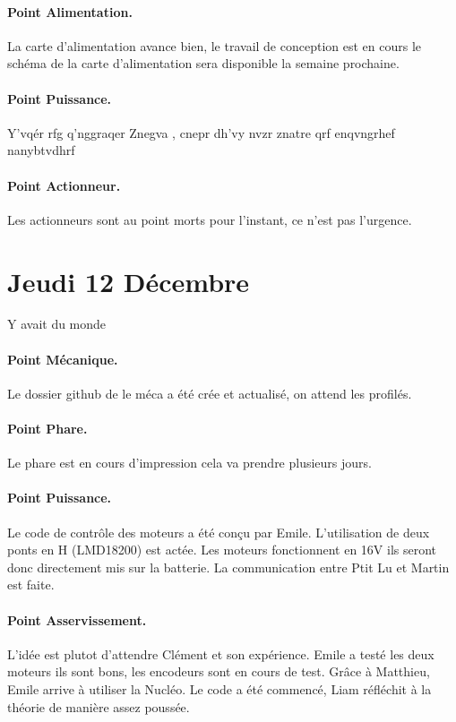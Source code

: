 \documentclass[a4paper,10pt]{report}
\theoremstyle{definition}
\begin{document}
\begin{spacing}{1.5}
\paragraph*{Point Alimentation.}
La carte d'alimentation avance bien, le travail de conception est en cours le
schéma de la carte d'alimentation sera disponible la semaine prochaine.

\paragraph*{Point Puissance.}
Y'vqér rfg q'nggraqer Znegva , cnepr dh'vy nvzr znatre qrf enqvngrhef nanybtvdhrf

\paragraph*{Point Actionneur.}
Les actionneurs sont au point morts pour l'instant, ce n'est pas l'urgence.

\newpage
\section*{Jeudi 12 Décembre}
Y avait du monde
\paragraph{Point Mécanique.}
Le dossier github de le méca a été crée et actualisé, on attend les profilés.
\paragraph{Point Phare.}
Le phare est en cours d'impression cela va prendre plusieurs jours.
\paragraph{Point Puissance.}
Le code de contrôle des moteurs a été conçu par Emile. L'utilisation de deux
ponts en H (LMD18200) est actée. Les moteurs fonctionnent en 16V ils seront donc
directement mis sur la batterie. La communication entre Ptit Lu et Martin est
faite.
\paragraph{Point Asservissement.}
L'idée est plutot d'attendre Clément et son expérience. Emile a testé les deux
moteurs ils sont bons, les encodeurs sont en cours de test. Grâce à Matthieu,
Emile arrive à utiliser la Nucléo. Le code a été commencé, Liam réfléchit à la
théorie de manière assez poussée.

\end{spacing}
\end{document}
